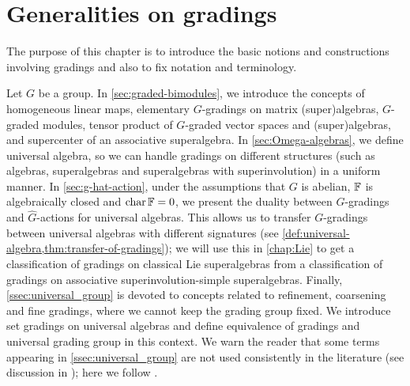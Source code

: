 \chapter{Generalities on gradings}\label{sec:generalities}




The purpose of this chapter is to introduce the basic notions and constructions involving gradings and also to fix notation and terminology.  

Let $G$ be a group. 
In \cref{sec:graded-bimodules}, we introduce the concepts of homogeneous linear maps, elementary $G$-gradings on matrix (super)algebras, $G$-graded modules, tensor product of $G$-graded vector spaces and (super)algebras, and supercenter of an associative superalgebra.
In \cref{sec:Omega-algebras}, we define universal algebra, so we can handle gradings on different structures (such as algebras, superalgebras and superalgebras with superinvolution) in a uniform manner. 
In \cref{sec:g-hat-action}, under the assumptions that $G$ is abelian, $\mathbb{F}$ is algebraically closed and $\operatorname{char} \mathbb{F} = 0$, we present the duality between $G$-gradings and $\widehat G$-actions for universal algebras. 
This allows us to transfer $G$-gradings between universal algebras with different signatures (see  \cref{def:universal-algebra,thm:transfer-of-gradings}); we will use this in \cref{chap:Lie} to get a classification of gradings on classical Lie superalgebras from a classification of gradings on associative superinvolution-simple superalgebras. 
Finally, \cref{ssec:universal_group} is devoted to concepts related to refinement, coarsening and fine gradings, where we cannot keep the grading group fixed. 
We introduce set gradings on universal algebras and define equivalence of gradings and universal grading group in this context. 
We warn the reader that some terms appearing in \cref{ssec:universal_group} are not used consistently in the literature (see discussion in \cite[Section 2.7]{GS}); here we follow \cite{livromicha}. 


